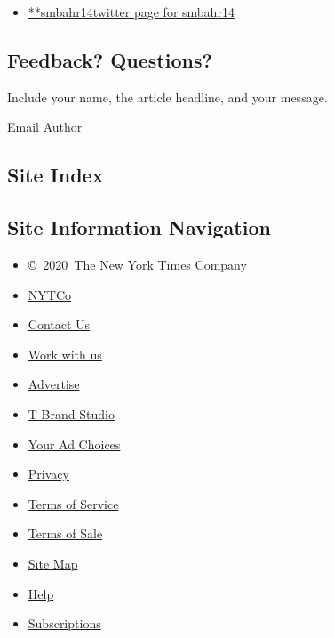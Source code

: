 \begin{itemize}
\tightlist
\item
  \href{https://twitter.com/smbahr14}{**smbahr14twitter page for
  smbahr14}
\end{itemize}

\hypertarget{feedback-questions}{%
\subsection{Feedback? Questions?}\label{feedback-questions}}

Include your name, the article headline, and your message.

Email Author

\hypertarget{site-index}{%
\subsection{Site Index}\label{site-index}}

\hypertarget{site-information-navigation}{%
\subsection{Site Information
Navigation}\label{site-information-navigation}}

\begin{itemize}
\tightlist
\item
  \href{https://help.nytimes3xbfgragh.onion/hc/en-us/articles/115014792127-Copyright-notice}{©~2020~The
  New York Times Company}
\end{itemize}

\begin{itemize}
\tightlist
\item
  \href{https://www.nytco.com/}{NYTCo}
\item
  \href{https://help.nytimes3xbfgragh.onion/hc/en-us/articles/115015385887-Contact-Us}{Contact
  Us}
\item
  \href{https://www.nytco.com/careers/}{Work with us}
\item
  \href{https://nytmediakit.com/}{Advertise}
\item
  \href{http://www.tbrandstudio.com/}{T Brand Studio}
\item
  \href{https://www.nytimes3xbfgragh.onion/privacy/cookie-policy\#how-do-i-manage-trackers}{Your
  Ad Choices}
\item
  \href{https://www.nytimes3xbfgragh.onion/privacy}{Privacy}
\item
  \href{https://help.nytimes3xbfgragh.onion/hc/en-us/articles/115014893428-Terms-of-service}{Terms
  of Service}
\item
  \href{https://help.nytimes3xbfgragh.onion/hc/en-us/articles/115014893968-Terms-of-sale}{Terms
  of Sale}
\item
  \href{https://spiderbites.nytimes3xbfgragh.onion}{Site Map}
\item
  \href{https://help.nytimes3xbfgragh.onion/hc/en-us}{Help}
\item
  \href{https://www.nytimes3xbfgragh.onion/subscription?campaignId=37WXW}{Subscriptions}
\end{itemize}
